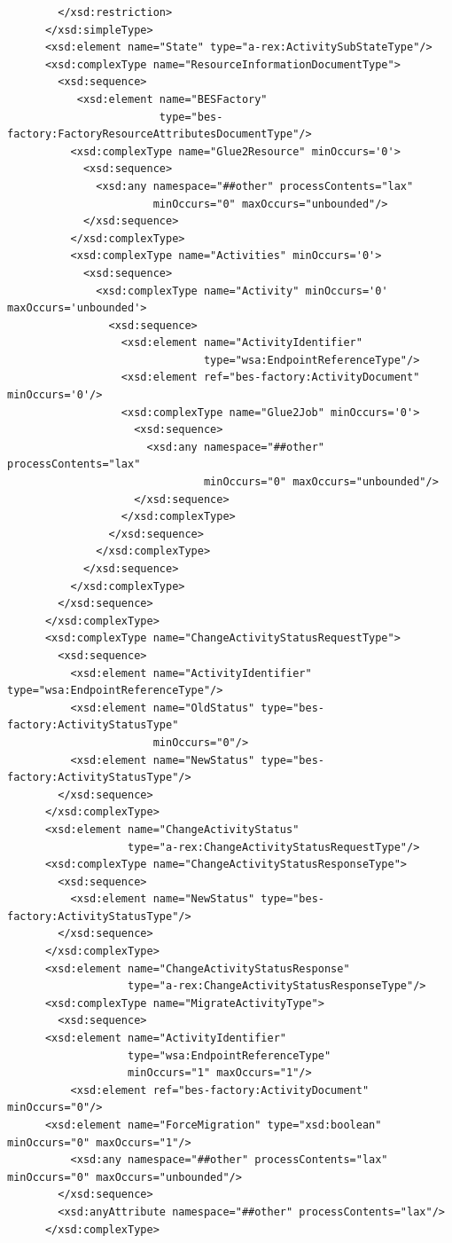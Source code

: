 \documentclass{article}                            %
\begin{document}
\begin{footnotesize}
\begin{verbatim}
        </xsd:restriction>
      </xsd:simpleType>
      <xsd:element name="State" type="a-rex:ActivitySubStateType"/>
      <xsd:complexType name="ResourceInformationDocumentType">
        <xsd:sequence>
           <xsd:element name="BESFactory"
                        type="bes-factory:FactoryResourceAttributesDocumentType"/>
          <xsd:complexType name="Glue2Resource" minOccurs='0'>
            <xsd:sequence>
              <xsd:any namespace="##other" processContents="lax"
                       minOccurs="0" maxOccurs="unbounded"/>
            </xsd:sequence>
          </xsd:complexType>
          <xsd:complexType name="Activities" minOccurs='0'>
            <xsd:sequence>
              <xsd:complexType name="Activity" minOccurs='0' maxOccurs='unbounded'>
                <xsd:sequence>
                  <xsd:element name="ActivityIdentifier"
                               type="wsa:EndpointReferenceType"/>
                  <xsd:element ref="bes-factory:ActivityDocument" minOccurs='0'/>
                  <xsd:complexType name="Glue2Job" minOccurs='0'>
                    <xsd:sequence>
                      <xsd:any namespace="##other" processContents="lax"
                               minOccurs="0" maxOccurs="unbounded"/>
                    </xsd:sequence>
                  </xsd:complexType>
                </xsd:sequence>
              </xsd:complexType>
            </xsd:sequence>
          </xsd:complexType>
        </xsd:sequence>
      </xsd:complexType>
      <xsd:complexType name="ChangeActivityStatusRequestType">
        <xsd:sequence>
          <xsd:element name="ActivityIdentifier" type="wsa:EndpointReferenceType"/>
          <xsd:element name="OldStatus" type="bes-factory:ActivityStatusType"
                       minOccurs="0"/>
          <xsd:element name="NewStatus" type="bes-factory:ActivityStatusType"/>
        </xsd:sequence>
      </xsd:complexType>
      <xsd:element name="ChangeActivityStatus"
                   type="a-rex:ChangeActivityStatusRequestType"/>
      <xsd:complexType name="ChangeActivityStatusResponseType">
        <xsd:sequence>
          <xsd:element name="NewStatus" type="bes-factory:ActivityStatusType"/>
        </xsd:sequence>
      </xsd:complexType>
      <xsd:element name="ChangeActivityStatusResponse"
                   type="a-rex:ChangeActivityStatusResponseType"/>
      <xsd:complexType name="MigrateActivityType">
        <xsd:sequence>
	  <xsd:element name="ActivityIdentifier" 
	  	           type="wsa:EndpointReferenceType" 
	  	           minOccurs="1" maxOccurs="1"/>
          <xsd:element ref="bes-factory:ActivityDocument" minOccurs="0"/>
	  <xsd:element name="ForceMigration" type="xsd:boolean" minOccurs="0" maxOccurs="1"/>    
          <xsd:any namespace="##other" processContents="lax" minOccurs="0" maxOccurs="unbounded"/>        
        </xsd:sequence>
        <xsd:anyAttribute namespace="##other" processContents="lax"/>
      </xsd:complexType>


\end{verbatim}
\end{footnotesize}
\end{document}
